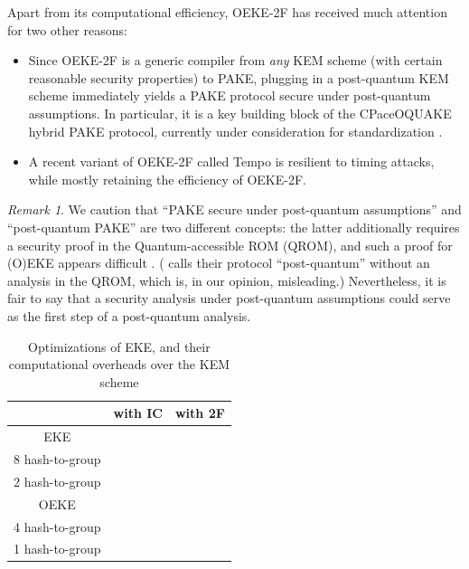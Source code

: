 \documentclass{article}
\theoremstyle{plain}
\theoremstyle{definition}
\theoremstyle{remark}
\newtheorem{remark}{Remark}
\begin{document}
Apart from its computational efficiency, OEKE-2F has received much attention for two other reasons:
\begin{itemize}
  \item Since OEKE-2F is a generic compiler from \emph{any} KEM scheme (with certain reasonable security properties) to PAKE, plugging in a post-quantum KEM scheme immediately yields a PAKE protocol secure under post-quantum assumptions. In particular, it is a key building block of the CPaceOQUAKE hybrid PAKE protocol, currently under consideration for standardization \cite{draft:hybrid-pake}. 
  \item A recent variant of OEKE-2F called Tempo \cite{TCHES:ArrBarJar26} is resilient to timing attacks, while mostly retaining the efficiency of OEKE-2F.
\end{itemize}
\begin{remark}
We caution that ``PAKE secure under post-quantum assumptions'' and ``post-quantum PAKE'' are two different concepts: the latter additionally requires a security proof in the Quantum-accessible ROM (QROM), and such a proof for (O)EKE appears difficult \cite{EPRINT:HHKR25}. (\cite{draft:hybrid-pake} calls their protocol ``post-quantum'' without an analysis in the QROM, which is, in our opinion, misleading.) Nevertheless, it is fair to say that a security analysis under post-quantum assumptions could serve as the first step of a post-quantum analysis.
\end{remark}
\begin{table}[H]\centering
\begin{tabular}{ |c|c|c| }
\hline
 & with IC & with 2F \\
\hline
EKE & \makecell{\cite{SP:BelMer92,EC:BelPoiRog00} \\ 8 hash-to-group} & \makecell{\cite{CCS:McQRosRoy20} \\ 2 hash-to-group} \\
\hline
OEKE & \makecell{\cite{CCS:BreChePoi03} \\ 4 hash-to-group} & \makecell{\cite{EC:JanRoyXu25,EPRINT:ArrBarJar25} \\ 1 hash-to-group} \\
\hline
\end{tabular}
\caption{Optimizations of EKE, and their computational overheads over the KEM scheme}
\end{table}
\end{document}
